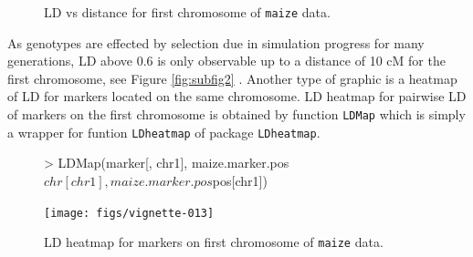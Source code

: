 \documentclass[a4paper,11pt]{article}
\begin{document}
\begin{figure}[!ht]
\centering
{}\qquad
{}
\caption{LD  vs distance for first chromosome of \texttt{maize} data. }
\end{figure}

As genotypes are effected by selection due in simulation progress for many generations, LD above 0.6 is only observable up to a distance of 10 cM for the first chromosome, see Figure \ref{fig:subfig2} . Another type of graphic is a heatmap of LD for markers located on the same chromosome. LD heatmap for pairwise LD of markers on the first chromosome is obtained by function \texttt{LDMap} which is simply a wrapper for funtion \texttt{LDheatmap} of package \texttt{LDheatmap}.


\begin{figure}[!ht]
\begin{Schunk}
\begin{Sinput}
> LDMap(marker[, chr1], maize.marker.pos$chr[chr1], maize.marker.pos$pos[chr1])
\end{Sinput}
\end{Schunk}
\texttt{[image: figs/vignette-013]}
\caption{LD heatmap for markers on first chromosome of \texttt{maize} data.}
\label{fig:LDMap}
\end{figure} 
\end{document}
